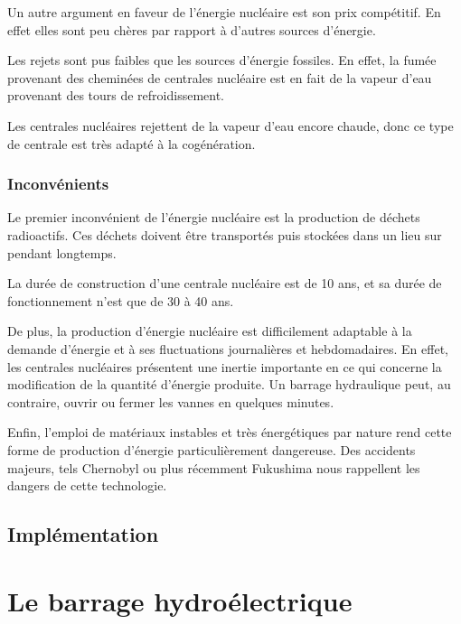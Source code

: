 \documentclass[12pt,a4paper,oneside,openany]{memoir}
\begin{document}
Un autre argument en faveur de l'énergie nucléaire est son prix compétitif. En effet elles sont peu chères par rapport à d'autres sources d'énergie.

Les rejets sont pus faibles que les sources d'énergie fossiles. En effet, la fumée provenant des cheminées de centrales nucléaire est en fait de la vapeur d'eau provenant des tours de refroidissement. 

Les centrales nucléaires rejettent de la vapeur d'eau encore chaude, donc ce type de centrale est très adapté à la cogénération.


\subsection{Inconvénients}
Le premier inconvénient de l'énergie nucléaire est la production de déchets radioactifs. Ces déchets doivent être transportés puis stockées dans un lieu sur pendant longtemps.

La durée de construction d'une centrale nucléaire est de 10 ans, et sa durée de fonctionnement n'est que de 30 à 40 ans.

De plus, la production d'énergie nucléaire est difficilement adaptable à la demande d'énergie et à ses fluctuations journalières et hebdomadaires. En effet, les centrales nucléaires présentent une inertie importante en ce qui concerne la modification de la quantité d'énergie produite. Un barrage hydraulique peut, au contraire, ouvrir ou fermer les vannes en quelques minutes.

Enfin, l'emploi de matériaux instables et très énergétiques par nature rend cette forme de production d'énergie particulièrement dangereuse. Des accidents majeurs, tels Chernobyl ou plus récemment Fukushima nous rappellent les dangers de cette technologie.

\section{Implémentation}

\chapter{Le barrage hydroélectrique}

\nocite{*}
\printbibliography
\end{document}
